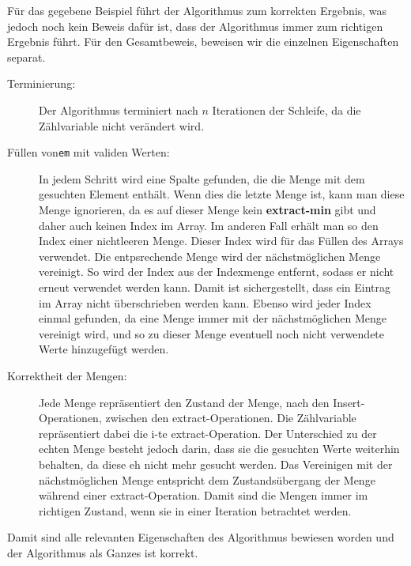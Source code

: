 \documentclass[a4paper,10pt]{article}
\begin{document}
\begin{enumerate}
\begin{table}[t]
\begin{tabular}{ c || c | c | l | l | l | p{1.5cm} | p{1.2cm} | l | p{1.2cm} || l }
	\hline
	\end{tabular}
	\caption{}\label{tab_2b}
	\end{table}
Für das gegebene Beispiel führt der Algorithmus zum korrekten Ergebnis, was jedoch noch kein Beweis dafür ist, dass der Algorithmus immer zum richtigen Ergebnis führt.
Für den Gesamtbeweis, beweisen wir die einzelnen Eigenschaften separat.
\begin{description}
	\item[Terminierung:] Der Algorithmus terminiert nach $n$ Iterationen der Schleife, da die Zählvariable nicht verändert wird.
	\item[Füllen von\texttt{em} mit validen Werten:] In jedem Schritt wird eine Spalte gefunden, die die Menge mit dem gesuchten Element enthält. Wenn dies die letzte Menge ist, kann man diese Menge ignorieren, da es auf dieser Menge kein \textbf{extract-min} gibt und daher auch keinen Index im Array. Im anderen Fall erhält man so den Index einer nichtleeren Menge. Dieser Index wird für das Füllen des Arrays verwendet. Die entpsrechende Menge wird der nächstmöglichen Menge vereinigt. So wird der Index aus der Indexmenge entfernt, sodass er nicht erneut verwendet werden kann. Damit ist sichergestellt, dass ein Eintrag im Array nicht überschrieben werden kann. Ebenso wird jeder Index einmal gefunden, da eine Menge immer mit der nächstmöglichen Menge vereinigt wird, und so zu dieser Menge eventuell noch nicht verwendete Werte hinzugefügt werden.
	\item[Korrektheit der Mengen:] Jede Menge repräsentiert den Zustand der Menge, nach den Insert-Operationen, zwischen den extract-Operationen. Die Zählvariable repräsentiert dabei die i-te extract-Operation. Der Unterschied zu der echten Menge besteht jedoch darin, dass sie die gesuchten Werte weiterhin behalten, da diese eh nicht mehr gesucht werden. Das Vereinigen mit der nächstmöglichen Menge entspricht dem Zustandsübergang der Menge während einer extract-Operation. Damit sind die Mengen immer im richtigen Zustand, wenn sie in einer Iteration betrachtet werden.
\end{description}
Damit sind alle relevanten Eigenschaften des Algorithmus bewiesen worden und der Algorithmus als Ganzes ist korrekt.


\end{enumerate}
\end{document}
